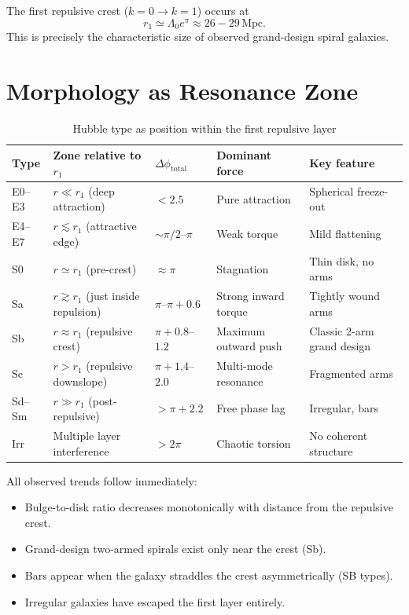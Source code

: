 \documentclass[dvipdfmx,11pt,a4paper]{article}
\begin{document}
The first repulsive crest ($k=0 \to k=1$) occurs at
\begin{equation}
r_1 \simeq \Lambda_0 e^\pi \approx 26-29\,\mathrm{Mpc}.
\end{equation}
This is precisely the characteristic size of observed grand-design spiral galaxies.

\section{Morphology as Resonance Zone}

\begin{table}[ht]
\centering
\caption{Hubble type as position within the first repulsive layer}
\label{tab:resonance}
\footnotesize
\setlength{\tabcolsep}{3.5pt}
\begin{tabular}{@{}lllll@{}}
\toprule
Type & Zone relative to $r_1$ & $\Delta\phi_{\mathrm{total}}$ & Dominant force & Key feature \\
\midrule
E0--E3 & $r \ll r_1$ (deep attraction) & $< 2.5$ & Pure attraction & Spherical freeze-out \\
E4--E7 & $r \lesssim r_1$ (attractive edge) & $\sim \pi/2$--$\pi$ & Weak torque & Mild flattening \\
S0 & $r \simeq r_1$ (pre-crest) & $\approx \pi$ & Stagnation & Thin disk, no arms \\
Sa & $r \gtrsim r_1$ (just inside repulsion) & $\pi$--$\pi{+}0.6$ & Strong inward torque & Tightly wound arms \\
Sb & $r \approx r_1$ (repulsive crest) & $\pi{+}0.8$--$1.2$ & Maximum outward push & Classic 2-arm grand design \\
Sc & $r > r_1$ (repulsive downslope) & $\pi{+}1.4$--$2.0$ & Multi-mode resonance & Fragmented arms \\
Sd--Sm & $r \gg r_1$ (post-repulsive) & $> \pi{+}2.2$ & Free phase lag & Irregular, bars \\
Irr & Multiple layer interference & $> 2\pi$ & Chaotic torsion & No coherent structure \\
\bottomrule
\end{tabular}
\end{table}

All observed trends follow immediately:
\begin{itemize}
\item Bulge-to-disk ratio decreases monotonically with distance from the repulsive crest.
\item Grand-design two-armed spirals exist only near the crest (Sb).
\item Bars appear when the galaxy straddles the crest asymmetrically (SB types).
\item Irregular galaxies have escaped the first layer entirely.
\end{itemize}
\end{document}
